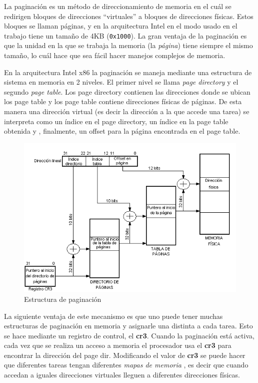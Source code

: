 	La paginación es un método de direccionamiento de memoria
en el cuál se redirigen bloques de direcciones ``virtuales''
a bloques de direcciones físicas. Estos bloques se llaman páginas, y
en la arquitectura Intel en el modo usado en el trabajo tiene
un tamaño de 4KB (\texttt{0x1000}). La gran ventaja de la paginación
es que la unidad en la que se trabaja la memoria (la \textit{página})
tiene siempre el mismo tamaño, lo cuál hace que sea fácil hacer manejos
complejos de memoria.

	En la arquitectura Intel x86 la paginación se maneja mediante
una estructura de sistema en memoria en 2 niveles. El primer nivel se llama
\textit{page directory} y el segundo \textit{page table}. Los page directory
contienen las direcciones donde se ubican los page table y los page
table contiene direcciones físicas de páginas. De esta manera una dirección
virtual (es decir la dirección a la que accede una tarea) se interpreta
como un índice en el page directory, un índice en la page table obtenida y
, finalmente, un offset para la página encontrada en el page table.

\begin{figure}[h]
\begin{center}
  \includegraphics[scale=0.7]{secciones/dibujitos/mmu.png}
\end{center}
\caption{Estructura de paginaci\'on}
\end{figure}

	La siguiente ventaja de este mecanismo es que uno puede tener muchas
estructuras de paginación en memoria y asignarle una distinta a cada tarea.
Esto se hace mediante un registro de control, el \textbf{cr3}. Cuando la
paginación está activa, cada vez que se realiza un acceso a memoria
el procesador usa el \textbf{cr3} para encontrar la dirección del page dir. Modificando
el valor de \textbf{cr3} se puede hacer que diferentes tareas tengan diferentes \textit{mapas de memoria}
, es decir que cuando accedan a iguales direcciones virtuales lleguen a
diferentes direcciones físicas.

